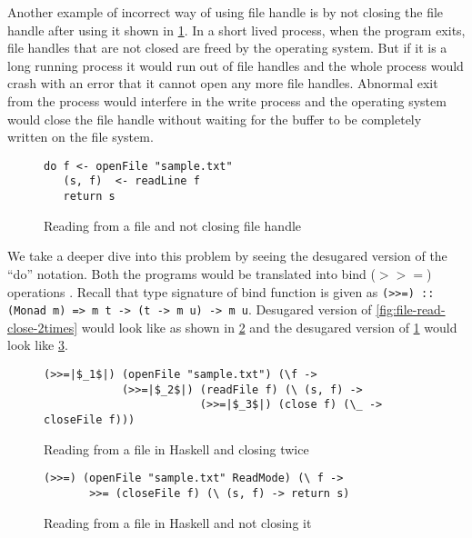 Another example of incorrect way of using file handle is by not closing the file handle after using it shown in \cref{fig:file-read-noclose}.
In a short lived process, when the program exits, file handles that are not closed are freed by the operating system.
But if it is a long running process it would run out of file handles and the whole process would crash with an error that
it cannot open any more file handles. Abnormal exit from the process would interfere in the write process
and the operating system would close the file handle without waiting for the buffer to be completely
written on the file system.
\begin{figure}[h]
  \begin{framed}
    \begin{verbatim}
do f <- openFile "sample.txt"
   (s, f)  <- readLine f
   return s
    \end{verbatim}
  \end{framed}
  \caption{Reading from a file and not closing file handle}
  \label{fig:file-read-noclose}
\end{figure}
We take a deeper dive into this problem by seeing the desugared version of the ``do'' notation.
Both the programs would be translated into bind ($>>=$) operations . Recall that type signature of bind function is given as
\texttt{(>>=) :: (Monad m) => m t -> (t -> m u) -> m u}. Desugared version of \cref{fig:file-read-close-2times}
would look like as shown in \cref{fig:file-read-close-2times-desugared}
and the desugared version of \cref{fig:file-read-noclose} would look like \cref{fig:file-read-noclose-desugared}.

\begin{figure}[h]
  \begin{framed}
    \begin{verbatim}
(>>=|$_1$|) (openFile "sample.txt") (\f ->
            (>>=|$_2$|) (readFile f) (\ (s, f) ->
                        (>>=|$_3$|) (close f) (\_ -> closeFile f)))
    \end{verbatim}
  \end{framed}
  \caption{Reading from a file in Haskell and closing twice}
  \label{fig:file-read-close-2times-desugared}
\end{figure}

\begin{figure}[h]
  \begin{framed}
\begin{verbatim}
(>>=) (openFile "sample.txt" ReadMode) (\ f ->
       >>= (closeFile f) (\ (s, f) -> return s)
\end{verbatim}
  \end{framed}
  \caption{Reading from a file in Haskell and not closing it}
  \label{fig:file-read-noclose-desugared}
\end{figure}

